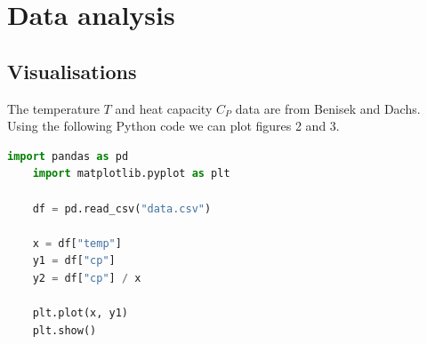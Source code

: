 \documentclass{article}
\begin{document}
\section{Data analysis}

\subsection{Visualisations}
The temperature $T$ and heat capacity $C_P$ data are from Benisek and Dachs.\cite*{benisek}
\\
Using the following Python code we can plot figures 2 and 3.
\begin{lstlisting}[language=Python]
    import pandas as pd
    import matplotlib.pyplot as plt

    df = pd.read_csv("data.csv")

    x = df["temp"]
    y1 = df["cp"]
    y2 = df["cp"] / x

    plt.plot(x, y1)
    plt.show()
\end{lstlisting}
\end{document}
